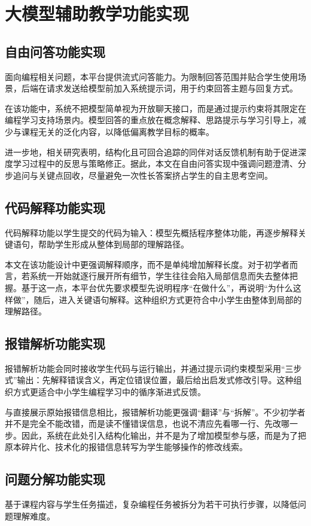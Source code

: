 \section{大模型辅助教学功能实现}
\subsection{自由问答功能实现}
面向编程相关问题，本平台提供流式问答能力。为限制回答范围并贴合学生使用场景，后端在请求发送给模型前加入系统提示词，用于约束回答主题与回复方式。

在该功能中，系统不把模型简单视为开放聊天接口，而是通过提示约束将其限定在编程学习支持场景内。模型回答的重点放在概念解释、思路提示与学习引导上，减少与课程无关的泛化内容，以降低偏离教学目标的概率。

进一步地，相关研究表明，结构化且可回合追踪的同伴对话反馈机制有助于促进深度学习过程中的反思与策略修正\cite{yao2022dialogue,li2023trust}。据此，本文在自由问答实现中强调问题澄清、分步追问与关键点回收，尽量避免一次性长答案挤占学生的自主思考空间。

\subsection{代码解释功能实现}
代码解释功能以学生提交的代码为输入：模型先概括程序整体功能，再逐步解释关键语句，帮助学生形成从整体到局部的理解路径。

本文在该功能设计中更强调解释顺序，而不是单纯增加解释长度。对于初学者而言，若系统一开始就逐行展开所有细节，学生往往会陷入局部信息而失去整体把握。基于这一点，本平台优先要求模型先说明程序“在做什么”，再说明“为什么这样做”，随后，进入关键语句解释。这种组织方式更符合中小学生由整体到局部的理解路径。

\subsection{报错解析功能实现}
报错解析功能会同时接收学生代码与运行输出，并通过提示词约束模型采用“三步式”输出：先解释错误含义，再定位错误位置，最后给出启发式修改引导。这种组织方式更适合中小学生编程学习中的循序渐进式反馈。

与直接展示原始报错信息相比，报错解析功能更强调“翻译”与“拆解”。不少初学者并不是完全不能改错，而是读不懂错误信息，也说不清应先看哪一行、先改哪一步。因此，系统在此处引入结构化输出，并不是为了增加模型参与感，而是为了把原本碎片化、技术化的报错信息转写为学生能够操作的修改线索。

\subsection{问题分解功能实现}
基于课程内容与学生任务描述，复杂编程任务被拆分为若干可执行步骤，以降低问题理解难度。


